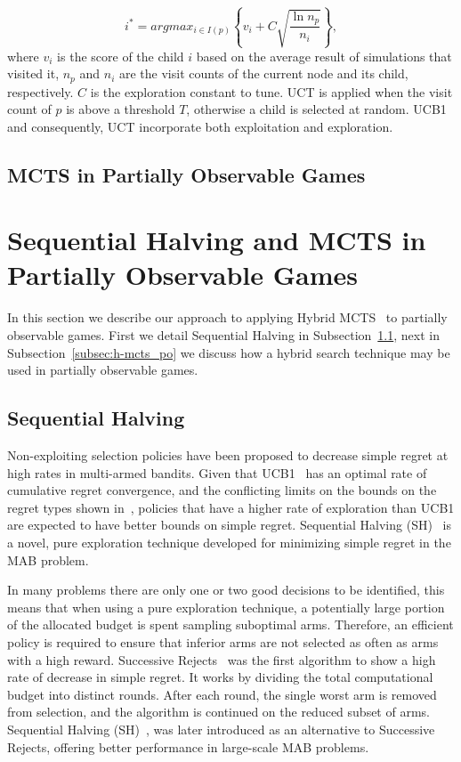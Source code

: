 \documentclass[a4paper]{llncs}
\begin{document}
\begin{equation}
\label{eq:uct}
i^* = argmax_{i \in I(p)}\left\{ v_i + C \sqrt{ \frac{\ln{n_p}}{n_i}}\right\},
\end{equation}
where $v_i$ is the score of the child $i$ based on the average result of simulations that visited it, $n_p$ and $n_i$ are the visit counts of the current node and its child, respectively. $C$ is the exploration constant to tune. UCT is applied when the visit count of $p$ is above a threshold $T$, otherwise a child is selected at random. UCB1 and consequently, UCT incorporate both exploitation and exploration.

\subsection{MCTS in Partially Observable Games}
\label{subsec:mcts-po-games}

\section{Sequential Halving and MCTS in Partially Observable Games}
\label{sec:h-mcts}

In this section we describe our approach to applying Hybrid MCTS~\cite{Pepels14hmcts} to partially observable games. First we detail Sequential Halving in Subsection~\ref{subsec:seq_halving}, next in Subsection~\ref{subsec:h-mcts_po} we discuss how a hybrid search technique may be used in partially observable games.

\subsection{Sequential Halving}
\label{subsec:seq_halving}

Non-exploiting selection policies have been proposed to decrease simple regret at high rates in multi-armed bandits. Given that UCB1~\cite{auer2002using} has an optimal rate of cumulative regret convergence, and the conflicting limits on the bounds on the regret types shown in~\cite{Bubeck11Pure}, policies that have a higher rate of exploration than UCB1 are expected to have better bounds on simple regret. Sequential Halving (SH)~\cite{Karnin13SH} is a novel, pure exploration technique developed for minimizing simple regret in the MAB problem.

In many problems there are only one or two good decisions to be identified, this means that when using a pure exploration technique, a potentially large portion of the allocated budget is spent sampling suboptimal arms. Therefore, an efficient policy is required to ensure that inferior arms are not selected as often as arms with a high reward. Successive Rejects~\cite{audibert2010best} was the first algorithm to show a high rate of decrease in simple regret. It works by dividing the total computational budget into distinct rounds. After each round, the single worst arm is removed from selection, and the algorithm is continued on the reduced subset of arms. Sequential Halving (SH)~\cite{Karnin13SH}, was later introduced as an alternative to Successive Rejects, offering better performance in large-scale MAB problems.
\end{document}
